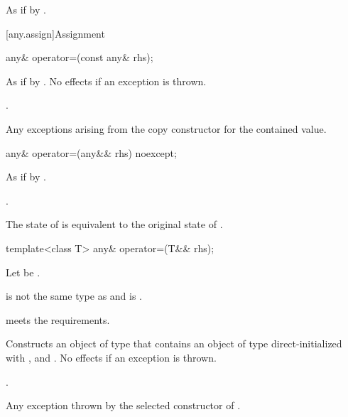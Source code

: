 \begin{itemdescr}
\pnum
\effects
As if by .
\end{itemdescr}

[any.assign]{Assignment}

%
\begin{itemdecl}
any& operator=(const any& rhs);
\end{itemdecl}

\begin{itemdescr}
\pnum
\effects
As if by .
No effects if an exception is thrown.

\pnum
\returns
{}.

\pnum
\throws
Any exceptions arising from the copy constructor for the contained value.
\end{itemdescr}

%
\begin{itemdecl}
any& operator=(any&& rhs) noexcept;
\end{itemdecl}

\begin{itemdescr}
\pnum
\effects
As if by .

\pnum
\returns
{}.

\pnum
\ensures
The state of  is equivalent to the original state of .
\end{itemdescr}

%
\begin{itemdecl}
template<class T>
  any& operator=(T&& rhs);
\end{itemdecl}

\begin{itemdescr}
\pnum
Let  be .

\pnum
\constraints
{} is not the same type as  and
 is .

\pnum
\expects
{} meets the  requirements.

\pnum
\effects
Constructs an object  of type  that contains an object of type  direct-initialized with , and .
No effects if an exception is thrown.

\pnum
\returns
{}.

\pnum
\throws
Any exception thrown by the selected constructor of .
\end{itemdescr}

